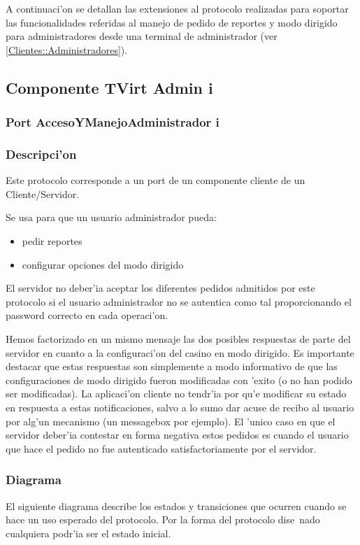 A continuaci'on se detallan las extensiones al protocolo realizadas para soportar las funcionalidades referidas al manejo de pedido de reportes y modo dirigido para administradores desde una terminal de administrador (ver \ref{Clientes::Administradores}).

\subsection{Componente TVirt Admin i} 
\subsubsection{Port AccesoYManejoAdministrador i }

\subsubsection{Descripci'on}

Este protocolo corresponde a un port de un componente cliente de un Cliente/Servidor.

Se usa para que un usuario administrador pueda:
\begin{itemize}
    \item{pedir reportes}
    \item{configurar opciones del modo dirigido}
\end{itemize}

El servidor no deber'ia aceptar los diferentes pedidos admitidos por este protocolo si el usuario administrador no se autentica como tal proporcionando el password correcto en cada operaci'on.

Hemos factorizado en un mismo mensaje las dos posibles respuestas de parte del servidor en cuanto a la configuraci'on del casino en modo dirigido. Es importante destacar que estas respuestas son simplemente a modo informativo de que las configuraciones de modo dirigido fueron modificadas con 'exito (o no han podido ser modificadas). La aplicaci'on cliente no tendr'ia por qu'e modificar su estado en respuesta a estas notificaciones, salvo a lo sumo dar acuse de recibo al usuario por alg'un mecanismo (un messagebox por ejemplo). El 'unico caso en que el servidor deber'ia contestar en forma negativa estos pedidos es cuando el usuario que hace el pedido no fue autenticado satisfactoriamente por el servidor.

\subsubsection{Diagrama}
El siguiente diagrama describe los estados y transiciones que ocurren cuando se hace un uso esperado del protocolo.
Por la forma del protocolo dise~nado cualquiera podr'ia ser el estado inicial.

